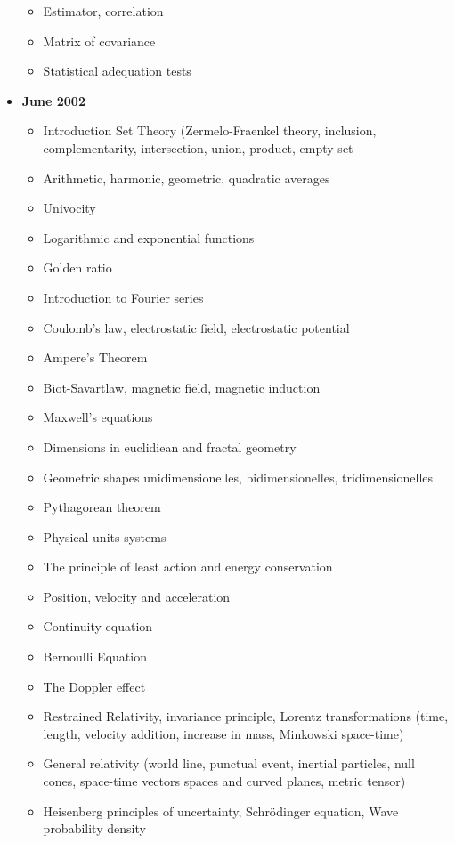 \documentclass[12pt,a4paper,twoside,openright]{report}
\theoremstyle{definition}
\theoremstyle{itexmp}
\numberwithin{equation}{section}
\begin{document}
\begin{itemize}
\begin{itemize}[noitemsep]
			\item Estimator, correlation
			\item Matrix of covariance
			\item Statistical adequation tests
		\end{itemize}
		\item \textbf{June 2002}
			\begin{itemize}[noitemsep]
				\item Introduction Set Theory (Zermelo-Fraenkel theory, inclusion, complementarity, intersection, union, product, empty set
				\item Arithmetic, harmonic, geometric, quadratic averages
				\item Univocity
				\item Logarithmic and exponential functions
				\item Golden ratio
				\item Introduction to Fourier series
				\item Coulomb's law, electrostatic field, electrostatic potential
				\item Ampere's Theorem
				\item Biot-Savartlaw, magnetic field, magnetic induction
				\item Maxwell's equations
				\item Dimensions in euclidiean and fractal geometry
				\item Geometric shapes unidimensionelles, bidimensionelles, tridimensionelles
				\item Pythagorean theorem
				\item Physical units systems
				\item The principle of least action and energy conservation
				\item Position, velocity and acceleration
				\item Continuity equation
				\item Bernoulli Equation
				\item The Doppler effect
				\item Restrained Relativity, invariance principle, Lorentz transformations (time, length, velocity addition, increase in mass, Minkowski space-time)
				\item General relativity (world line, punctual event, inertial particles, null cones, space-time vectors spaces and curved planes, metric tensor)
				\item Heisenberg principles of uncertainty, Schrödinger equation, Wave probability density

\end{itemize}
\end{itemize}
\end{document}
